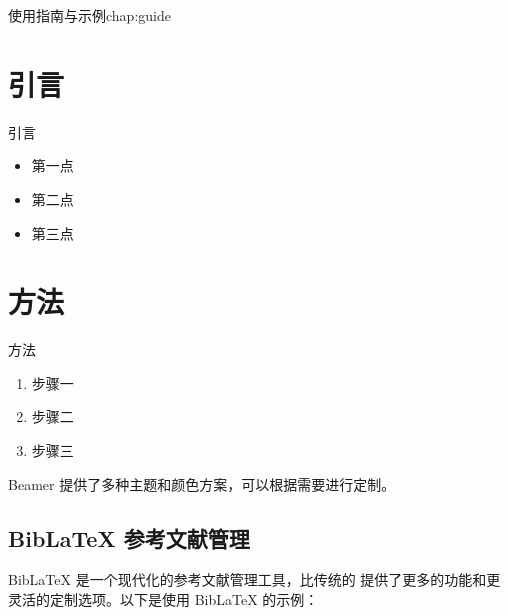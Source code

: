\begin{cuzchapter}{使用指南与示例}{chap:guide}
\begin{listing}[htbp]
\begin{texcode}
            \section{引言}

            \begin{frame}{引言}
                \begin{itemize}
                    \item 第一点
                    \item 第二点
                    \item 第三点
                \end{itemize}
            \end{frame}

            \section{方法}

            \begin{frame}{方法}
                \begin{enumerate}
                    \item 步骤一
                    \item 步骤二
                    \item 步骤三
                \end{enumerate}
            \end{frame}

            
        \end{texcode}
    \end{listing}

    Beamer 提供了多种主题和颜色方案，可以根据需要进行定制。

    \subsection{Bib\LaTeX{} 参考文献管理}\label{sub:biblatex}

    Bib\LaTeX{} 是一个现代化的参考文献管理工具，比传统的  提供了更多的功能和更灵活的定制选项。以下是使用 Bib\LaTeX{} 的示例：

    \begin{listing}[htbp]
        \caption{Bib\LaTeX{} 使用示例}
        \label{code:biblatex-example}
        \begin{texcode}
            \usepackage[
                backend=biber,
                style=gb7714-2015,
                sorting=nyt,
                giveninits=true
            ]{biblatex}


\end{texcode}
\end{listing}
\end{cuzchapter}
